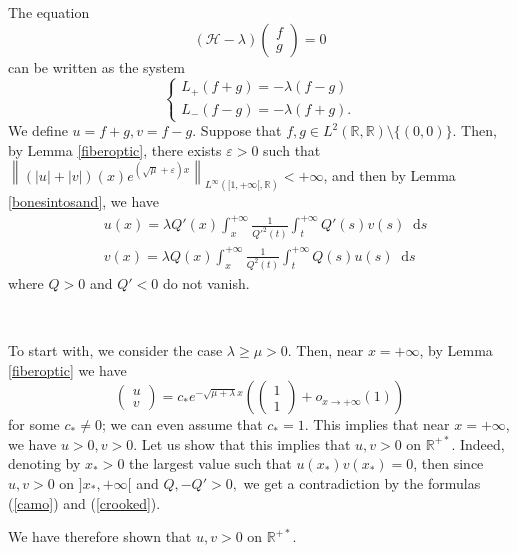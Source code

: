 \documentclass[11 pt]{amsart}
\theoremstyle{definition}
\theoremstyle{remark}
\numberwithin{equation}{section}
\newcommand{\dd}{\mathop{}\!\mathrm{d}}
\begin{document}
The equation
\[ (\mathcal{H}- \lambda) \left(\begin{array}{c}
     f\\
     g
   \end{array}\right) = 0 \]
can be written as the system
\[ \left\{\begin{array}{l}
     L_+ (f + g) = - \lambda (f - g)\\
     L_- (f - g) = - \lambda (f + g) .
   \end{array}\right. \]
We define $u = f + g, v = f - g$. Suppose that $f, g \in L^2 (\mathbb{R},
\mathbb{R}) \setminus \{ (0,0) \}$. Then, by Lemma \ref{fiberoptic}, there exists $\varepsilon > 0$
such that $\left\| (| u | + | v |) (x) e^{\left( \sqrt{\mu} + \varepsilon
\right) x} \right\|_{L^{\infty} ([1, + \infty [, \mathbb{R})} < + \infty$, and
then by Lemma \ref{bonesintosand}, we have
\begin{align}
 & u (x) = \lambda Q' (x) \int_x^{+ \infty} \frac{1}{Q'^2 (t)
  } \int_t^{+ \infty} Q' (s)  v (s) \dd s \label{camo}\\
 & v (x) = \lambda Q (x) \int_x^{+ \infty} \frac{1}{Q^2 (t) }
  \int_t^{+ \infty} Q (s) u (s) \dd s \label{crooked}
\end{align}
where $Q>0$ and $Q'<0$ do not vanish.

\

To start with, we consider the case $\lambda \geqslant \mu > 0$. Then, near $x = +
\infty$, by Lemma \ref{fiberoptic} we have
\[ \left(\begin{array}{c}
     u\\
     v
   \end{array}\right) = c_{\ast}  e^{-\sqrt{ \mu  + 
   \lambda } x} \left( \left(\begin{array}{c}
       1\\
       1
     \end{array}\right) + o_{x \rightarrow + \infty} (1) \right) \]
for some $c_{\ast} \neq 0$; we can even assume that $c_{\ast} = 1$.
This implies that near $x = + \infty$, we have $u > 0, v > 0$. Let us show that this implies that $u, v > 0$ on
$\mathbb{R}^{+ \ast}$. Indeed, denoting by $x_{\ast} > 0$ the largest value
such that $u (x_{\ast}) v (x_{\ast}) = 0$, then since $u, v > 0$ on
$]x_{\ast}, + \infty [$ and $Q,-Q'>0,  $ we get a contradiction by the
formulas (\ref{camo}) and (\ref{crooked}).

We have therefore shown that $u, v > 0$ on $\mathbb{R}^{+ \ast}$.
\end{document}
